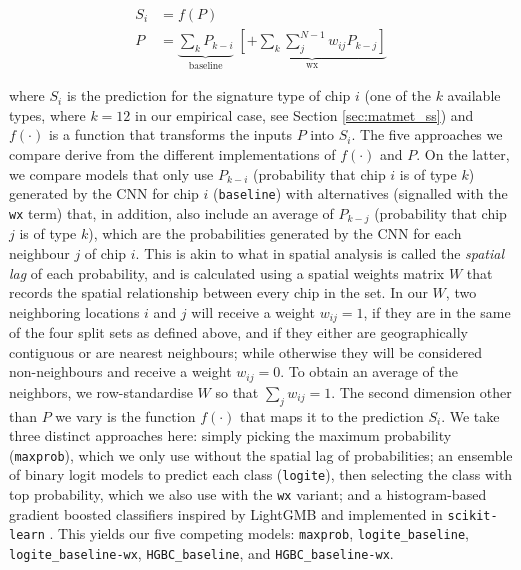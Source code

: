 \begin{equation}
\begin{split}
        S_i & = f(P) \\
        P & = \underbrace{
                \sum_{k} P_{k-i}
        }_\text{baseline}\;
        \underbrace{
                \left[+ \sum_{k} \sum_j^{N-1} w_{ij} P_{k-j}\right]
}_\text{wx}
        \label{eq:sp_model}
\end{split}
\end{equation}

where $S_i$ is the prediction for the signature type of chip $i$ (one of the
        $k$ available types, where
$k=12$ in our empirical case, see Section \ref{sec:matmet_ss}) and $f(\cdot)$ is a function that
transforms the inputs $P$ into $S_i$. The five
approaches we compare derive from the different implementations of $f(\cdot)$
and $P$. On the latter, we compare models that only use
$P_{k-i}$ (probability that chip $i$ is of type $k$) generated by the CNN for
chip $i$ (\texttt{baseline}) with alternatives
(signalled with the \texttt{wx} term) that, in addition,
also include an average of $P_{k-j}$ (probability that chip
$j$ is of type $k$), which are the
probabilities generated by the CNN for each neighbour $j$ of chip $i$. This is
akin to what in spatial analysis is called the \textit{spatial lag} of each
probability, and is calculated using a spatial weights matrix $W$ that records
the spatial relationship between every chip in the set. In our $W$, two
neighboring locations $i$ and $j$ will receive a weight $w_{ij}=1$,
if they are in the same of the four split sets as defined above, and if they
either are geographically contiguous or are nearest neighbours; while otherwise
they will be considered non-neighbours and receive a weight $w_{ij}=0$. To obtain
an average of the neighbors, we row-standardise $W$ so that $\sum_j w_{ij} =
1$. The second dimension other than $P$ we vary is the function $f(\cdot)$ that maps
it to the prediction $S_i$. We take three distinct approaches here: simply
picking the maximum probability (\texttt{maxprob}), which we only use without the spatial lag of
probabilities; an ensemble of binary logit models to predict each class
(\texttt{logite}), then selecting the class with top probability, which we
also use with the \texttt{wx} variant; and a histogram-based gradient boosted
classifiers inspired by LightGMB \citep{ke2017lightgbm} and implemented in
\texttt{scikit-learn} \citep{pedregosa2011scikit}. This yields our five
competing models:
\texttt{maxprob}, \texttt{logite\_baseline}, \texttt{logite\_baseline-wx},
\texttt{HGBC\_baseline}, and \texttt{HGBC\_baseline-wx}.

